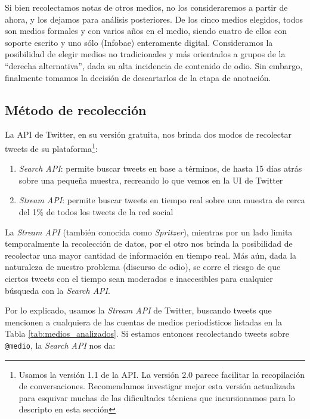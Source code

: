 Si bien recolectamos notas de otros medios, no los consideraremos a partir de ahora, y los dejamos para análisis posteriores. De los cinco medios elegidos, todos son medios formales y con varios años en el medio, siendo cuatro de ellos con soporte escrito y uno sólo (Infobae) enteramente digital. Consideramos la posibilidad de elegir medios no tradicionales y más orientados a grupos de la ``derecha alternativa'', dada su alta incidencia de contenido de odio. Sin embargo, finalmente tomamos la decisión de descartarlos de la etapa de anotación.


\subsection{Método de recolección}



La API de Twitter, en su versión gratuita, nos brinda dos modos de recolectar tweets de su plataforma\footnote{Usamos la versión 1.1 de la API. La versión 2.0 parece facilitar la recopilación de conversaciones. Recomendamos investigar mejor esta versión actualizada para esquivar muchas de las dificultades técnicas que incursionamos para lo descripto en esta sección}:

\begin{enumerate}
    \item \emph{Search API}: permite buscar tweets en base a términos, de hasta 15 días atrás sobre una pequeña muestra, recreando lo que vemos en la UI de Twitter
    \item \emph{Stream API}: permite buscar tweets en tiempo real sobre una muestra de cerca del 1\% de todos los tweets de la red social
\end{enumerate}

La \emph{Stream API} (también conocida como \emph{Spritzer}), mientras por un lado limita temporalmente la recolección de datos, por el otro nos brinda la posibilidad de recolectar una mayor cantidad de información en tiempo real. Más aún, dada la naturaleza de nuestro problema (discurso de odio), se corre el riesgo de que ciertos tweets con el tiempo sean moderados e inaccesibles para cualquier búsqueda con la \emph{Search API}.

Por lo explicado, usamos la \emph{Stream API} de Twitter, buscando tweets que mencionen a cualquiera de las cuentas de medios periodísticos listadas en la Tabla \ref{tab:medios_analizados}. Si estamos entonces recolectando tweets sobre \verb|@medio|, la \emph{Search API} nos da:

